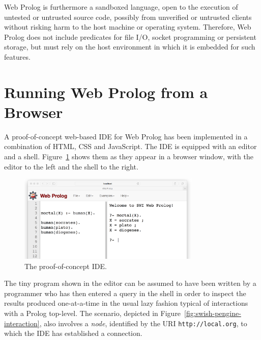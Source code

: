 \documentclass{tlp}
\begin{document}
Web Prolog is furthermore a sandboxed language, open to the execution of untested or untrusted source code, possibly from unverified or untrusted clients without risking harm to the host machine or operating system. Therefore, Web Prolog does not include predicates for file I/O, socket programming or persistent storage, but must rely on the host environment in which it is embedded for such features.


\section{Running Web Prolog from a Browser}\label{sec:browser}

A proof-of-concept web-based IDE for Web Prolog has been implemented in a combination of HTML, CSS and JavaScript. The IDE is equipped with an editor and a shell. Figure~\ref{fig:swish-first} shows them as they appear in a browser window, with the editor to the left and the shell to the right.

\begin{figure}[h]
    \centering
	\includegraphics[width=8.7cm]{swish-2}
    \caption{The proof-of-concept IDE.}
    \label{fig:swish-first}
\end{figure}

\noindent The tiny program shown in the editor can be assumed to have been written by a programmer who has then entered a query in the shell in order to inspect the results produced one-at-a-time in the usual lazy fashion typical of interactions with a Prolog top-level. The scenario, depicted in Figure~\ref{fig:swish-pengine-interaction}, also involves a \textit{node}, identified by the URI \texttt{http://local.org}, to which the IDE has established a connection.

\end{document}
